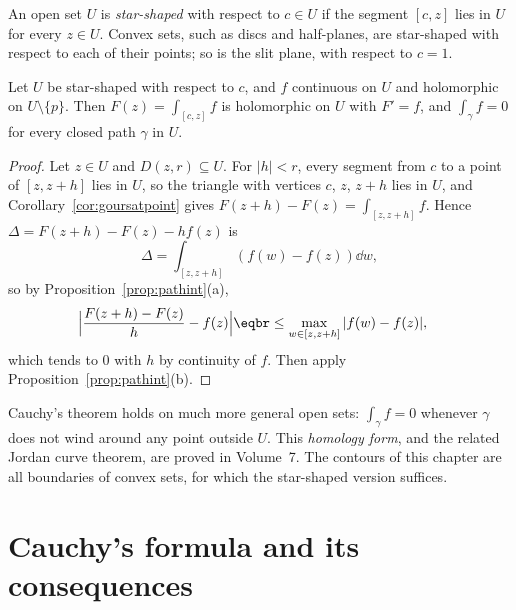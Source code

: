 An open set $U$ is \emph{star-shaped} with respect to $c\in U$ if the segment $[c,z]$ lies in $U$ for every $z\in U$. Convex sets, such as
discs and half-planes, are star-shaped with respect to each of their points; so is the slit plane, with respect to $c=1$.

\begin{theorem}\label{thm:cauchy}
Let $U$ be star-shaped with respect to $c$, and $f$ continuous on $U$ and holomorphic on $U\setminus\{p\}$. Then $F(z)=\int_{[c,z]}f$ is
holomorphic on $U$ with $F'=f$, and $\int_\gamma f=0$ for every closed path $\gamma$ in $U$.
\end{theorem}
\begin{proof}
Let $z\in U$ and $D(z,r)\subseteq U$. For $|h|<r$, every segment from $c$ to a point of $[z,z+h]$ lies in $U$, so the triangle with vertices
$c$, $z$, $z+h$ lies in $U$, and Corollary~\ref{cor:goursatpoint} gives $F(z+h)-F(z)=\int_{[z,z+h]}f$. Hence $\Delta=F(z+h)-F(z)-hf(z)$ is
\[
\Delta=\int_{[z,z+h]}(f(w)-f(z))\dd w,
\]
so by Proposition~\ref{prop:pathint}(a),
\[
\begin{aligned}{}&\Bigl|\frac{F(z+h)-F(z)}h-f(z)\Bigr|\eqbr\le\max_{w\in[z,z+h]}|f(w)-f(z)|,\end{aligned}
\]
which tends to $0$ with $h$ by continuity of $f$. Then apply Proposition~\ref{prop:pathint}(b).
\end{proof}

\begin{remark}
Cauchy's theorem holds on much more general open sets: $\int_\gamma f=0$ whenever $\gamma$ does not wind around any point outside $U$. This
\emph{homology form}, and the related Jordan curve theorem, are proved in Volume~7. The contours of this chapter are all
boundaries of convex sets, for which the star-shaped version suffices.
\end{remark}

\section{Cauchy's formula and its consequences}

